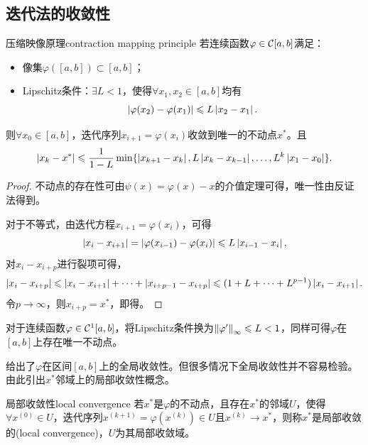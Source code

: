 \subsection{迭代法的收敛性}

\begin{theorem}
    {压缩映像原理}{contraction mapping principle}
    若连续函数$\varphi\in\mathcal C[a,b]$满足：
    \begin{itemize}
        \item 像集$\varphi([a,b])\subset[a,b]$；
        \item Lipschitz条件：$\exists L<1$，使得$\forall x_1,x_2\in[a,b]$均有
        \[
            \left\lvert\varphi(x_2)-\varphi(x_1)\right\rvert\leqslant L\left\lvert x_2-x_1\right\rvert.
        \]
    \end{itemize}
    则$\forall x_0\in[a,b]$，迭代序列$x_{i+1}=\varphi(x_i)$收敛到唯一的不动点$x^*$。且
    \begin{equation}
            \left\lvert x_k-x^*\right\rvert\leqslant\frac1{1-L}\min\{\left\lvert x_{k+1}-x_k\right\rvert,L\left\lvert x_k-x_{k-1}\right\rvert,\ldots,L^k\left\lvert x_1-x_0\right\rvert\}.
    \end{equation}
\end{theorem}

\begin{proof}
    不动点的存在性可由$\psi(x)=\varphi(x)-x$的介值定理可得，唯一性由反证法得到。

    对于不等式，由迭代方程$x_{i+1}=\varphi(x_i)$，可得
    \[
        \left\lvert x_i-x_{i+1}\right\rvert=\left\lvert\varphi(x_{i-1})-\varphi(x_i)\right\rvert\leqslant L\left\lvert x_{i-1}-x_i\right\rvert,
    \]
    对$x_i-x_{i+p}$进行裂项可得，
    \[
        \left\lvert x_i-x_{i+p}\right\rvert\leqslant\left\lvert x_i-x_{i+1}\right\rvert+\cdots+\left\lvert x_{i+p-1}-x_{i+p}\right\rvert\leqslant(1+L+\cdots+L^{p-1})\left\lvert x_i-x_{i+1}\right\rvert.
    \]
    令$p\to\infty$，则$x_{i+p}=x^*$，即得。
\end{proof}

\begin{corollary}
    对于连续函数$\varphi\in\mathcal C^1[a,b]$，将Lipschitz条件换为$\left\lVert\varphi'\right\rVert_\infty\leqslant L<1$，同样可得$\varphi$在$[a,b]$上存在唯一不动点。
\end{corollary}

\begin{remark}
     给出了$\varphi$在区间$[a,b]$上的全局收敛性。但很多情况下全局收敛性并不容易检验。由此引出$x^*$邻域上的局部收敛性概念。
\end{remark}

\begin{definition}
    {局部收敛性}{local convergence}
    若$x^*$是$\varphi$的不动点，且存在$x^*$的邻域$U$，使得$\forall x^{(0)}\in U$，迭代序列$x^{(k+1)}=\varphi(x^{(k)})\in U$且$x^{(k)}\to x^*$，则称$x^*$是局部收敛的(local convergence)，$U$为其局部收敛域。
\end{definition}

